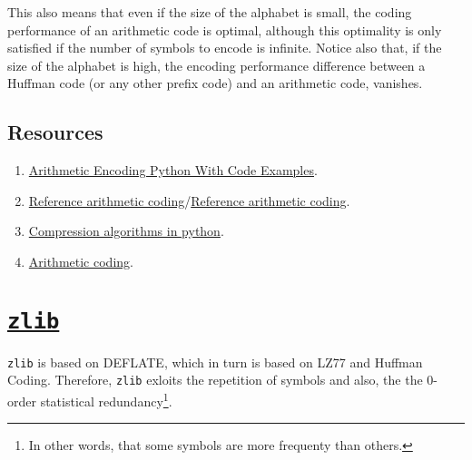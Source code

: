 This also means that even if the size of the alphabet is small, the
coding performance of an arithmetic code is optimal, although this
optimality is only satisfied if the number of symbols to encode is
infinite. Notice also that, if the size of the alphabet is high, the
encoding performance difference between a Huffman code (or any other
prefix code) and an arithmetic code, vanishes.

\subsection*{Resources}
\begin{enumerate}
\item
  \href{https://www.folkstalk.com/tech/arithmetic-encoding-python-with-code-examples/}{Arithmetic
    Encoding Python With Code Examples}.
\item \href{https://www.nayuki.io/page/reference-arithmetic-coding}{Reference arithmetic coding}/\href{https://github.com/nayuki/Reference-arithmetic-coding}{Reference arithmetic coding}.
\item \href{https://www.inference.org.uk/mackay/python/compress/#AC}{Compression algorithms in python}.
\item \href{https://github.com/vicente-gonzalez-ruiz/arithmetic_coding}{Arithmetic coding}.
\end{enumerate}

\section{\href{https://zlib.net/}{\texttt{zlib}}}

\texttt{zlib} is based on DEFLATE, which in turn is based on LZ77 and
Huffman Coding. Therefore, \texttt{zlib} exloits the repetition of
symbols and also, the the 0-order statistical redundancy\footnote{In
  other words, that some symbols are more frequenty than others.}.

